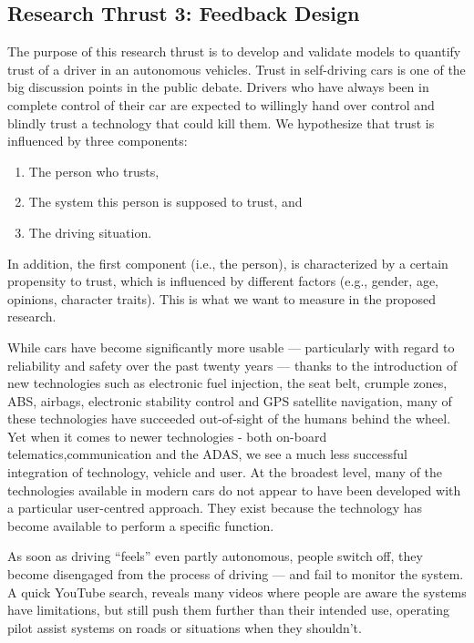 \subsection{Research Thrust 3: Feedback Design}
\label{sec:trust}


The purpose of this research thrust is to develop and validate models to quantify trust of a driver in an autonomous vehicles.
Trust in self-driving cars is one of the big discussion points in the public debate. 
Drivers who have always been in complete control of their car are expected to willingly hand over control and blindly trust a technology that could kill them.
We hypothesize that trust is influenced by three components:
\begin{enumerate}[itemsep=0pt,parsep=0pt,topsep=4pt,leftmargin=0.4in]
    \item The person who trusts,
    \item The system this person is supposed to trust, and
    \item The driving situation.
\end{enumerate}

In addition, the first component (i.e., the person), is characterized by a certain propensity to trust, which is influenced by different factors (e.g., gender, age, opinions, character traits). This is what we want to measure in the proposed research. 

While cars have become significantly more usable — particularly with regard to reliability and safety over the past twenty years — thanks to the introduction of new technologies such as electronic fuel injection, the seat belt, crumple zones, ABS, airbags, electronic stability control and GPS satellite navigation, many of these technologies have succeeded out-of-sight of the humans behind the wheel.
Yet when it comes to newer technologies - both on-board telematics,communication and the ADAS, we see a much less successful integration of technology, vehicle and user.
At the broadest level, many of the technologies available in modern cars do not appear to have been developed with a particular user-centred approach. 
They exist because the technology has become available to perform a specific function.

As soon as driving ``feels'' even partly autonomous, people switch off, they become disengaged from the process of driving — and fail to monitor the system. 
A quick YouTube search, reveals many videos where people are aware the systems have limitations, but still push them further than their intended use, operating pilot assist systems on roads or situations when they shouldn't.

